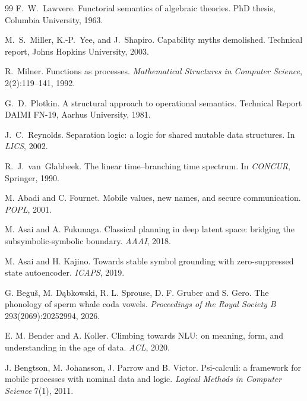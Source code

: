 \begin{thebibliography}{99}
F.~W.~Lawvere.
\newblock Functorial semantics of algebraic theories.
\newblock PhD thesis, Columbia University, 1963.

M.~S.~Miller, K.-P.~Yee, and J.~Shapiro.
\newblock Capability myths demolished.
\newblock Technical report, Johns Hopkins University, 2003.

R.~Milner.
\newblock Functions as processes.
\newblock \emph{Mathematical Structures in Computer Science}, 2(2):119--141, 1992.

G.~D.~Plotkin.
\newblock A structural approach to operational semantics.
\newblock Technical Report DAIMI FN-19, Aarhus University, 1981.

J.~C.~Reynolds.
\newblock Separation logic: a logic for shared mutable data structures.
\newblock In \emph{LICS}, 2002.

R.~J.~van~Glabbeek.
\newblock The linear time--branching time spectrum.
\newblock In \emph{CONCUR}, Springer, 1990.


 M. Abadi and C. Fournet. Mobile values, new names, and secure
communication. \emph{POPL}, 2001.

 M. Asai and A. Fukunaga. Classical planning in deep latent space:
bridging the subsymbolic-symbolic boundary. \emph{AAAI}, 2018.

 M. Asai and H. Kajino. Towards stable symbol grounding with
zero-suppressed state autoencoder. \emph{ICAPS}, 2019.

 G. Begu\v{s}, M. D\k{a}bkowski, R. L. Sprouse, D. F. Gruber and
S. Gero. The phonology of sperm whale coda vowels. \emph{Proceedings of the Royal
Society B} 293(2069):20252994, 2026.

 E. M. Bender and A. Koller. Climbing towards NLU: on meaning,
form, and understanding in the age of data. \emph{ACL}, 2020.

 J. Bengtson, M. Johansson, J. Parrow and B. Victor. Psi-calculi: a
framework for mobile processes with nominal data and logic. \emph{Logical Methods in
Computer Science} 7(1), 2011.


\end{thebibliography}
